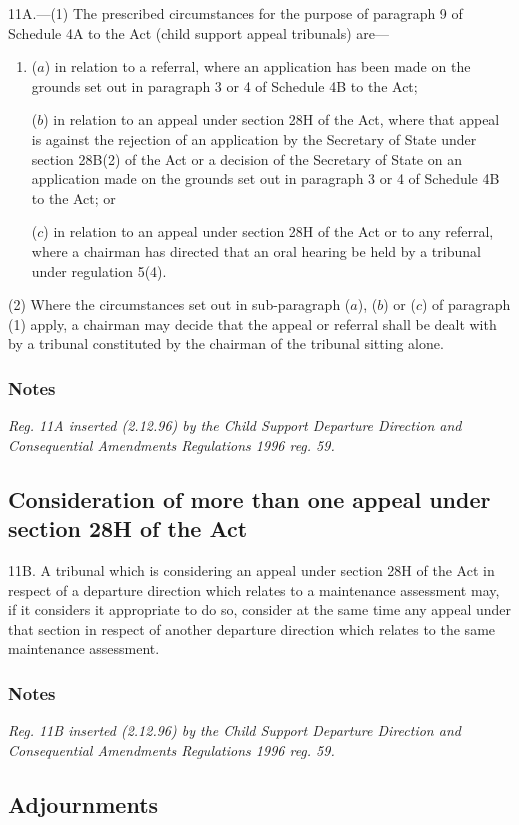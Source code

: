 \documentclass[a4paper]{article}
\newcommand\amendment[1]{\subsubsection*{Notes}{\itshape\frenchspacing\footnotesize #1 \par}}
\begin{document}
11A.—(1) The prescribed circumstances for the purpose of paragraph 9 of Schedule 4A to the Act (child support appeal tribunals) are—
\begin{enumerate}\item[]
($a$) in relation to a referral, where an application has been made on the grounds set out in paragraph 3 or 4 of Schedule 4B to the Act;

($b$) in relation to an appeal under section 28H of the Act, where that appeal is against the rejection of an application by the Secretary of State under section 28B(2) of the Act or a decision of the Secretary of State on an application made on the grounds set out in paragraph 3 or 4 of Schedule 4B to the Act; or

($c$) in relation to an appeal under section 28H of the Act or to any referral, where a chairman has directed that an oral hearing be held by a tribunal under regulation 5(4).
\end{enumerate}

(2) Where the circumstances set out in sub-paragraph ($a$), ($b$) or ($c$) of paragraph (1) apply, a chairman may decide that the appeal or referral shall be dealt with by a tribunal constituted by the chairman of the tribunal sitting alone.

\amendment{
Reg. 11A inserted (2.12.96) by the Child Support Departure Direction and Consequential Amendments Regulations 1996 reg. 59.
}

\subsection[11B. Consideration of more than one appeal under section 28H of the Act]{Consideration of more than one appeal under section 28H of the Act}

11B. A tribunal which is considering an appeal under section 28H of the Act in respect of a departure direction which relates to a maintenance assessment may, if it considers it appropriate to do so, consider at the same time any appeal under that section in respect of another departure direction which relates to the same maintenance assessment.

\amendment{
Reg. 11B inserted (2.12.96) by the Child Support Departure Direction and Consequential Amendments Regulations 1996 reg. 59.
}

\subsection[12. Adjournments]{Adjournments}
\end{document}
